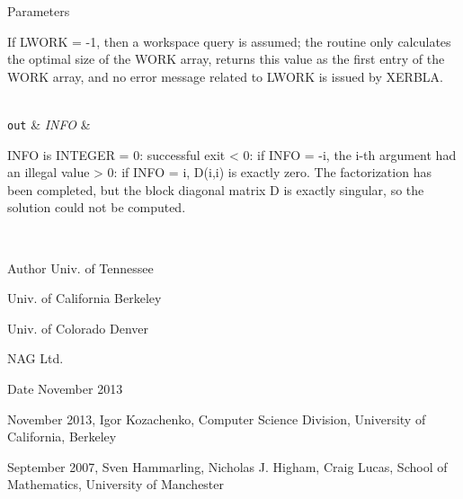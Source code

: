 \begin{DoxyParams}[1]{Parameters}
\begin{DoxyVerb}
          If LWORK = -1, then a workspace query is assumed; the routine
          only calculates the optimal size of the WORK array, returns
          this value as the first entry of the WORK array, and no error
          message related to LWORK is issued by XERBLA.\end{DoxyVerb}
\\
\hline
\mbox{\tt out}  & {\em I\+N\+F\+O} & \begin{DoxyVerb}          INFO is INTEGER
          = 0: successful exit
          < 0: if INFO = -i, the i-th argument had an illegal value
          > 0: if INFO = i, D(i,i) is exactly zero.  The factorization
               has been completed, but the block diagonal matrix D is
               exactly singular, so the solution could not be computed.\end{DoxyVerb}
 \\
\hline
\end{DoxyParams}
\begin{DoxyAuthor}{Author}
Univ. of Tennessee 

Univ. of California Berkeley 

Univ. of Colorado Denver 

N\+A\+G Ltd. 
\end{DoxyAuthor}
\begin{DoxyDate}{Date}
November 2013
\end{DoxyDate}
\begin{DoxyVerb}  November 2013,  Igor Kozachenko,
                  Computer Science Division,
                  University of California, Berkeley

  September 2007, Sven Hammarling, Nicholas J. Higham, Craig Lucas,
                  School of Mathematics,
                  University of Manchester\end{DoxyVerb}
 
